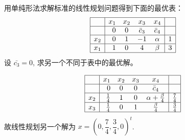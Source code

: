 \begin{Problem}
    用单纯形法求解标准的线性规划问题得到下面的最优表：
    \[\begin{array}{|l|rccc|c|}
        \hline & x_{1} & x_{2} & x_{3} & x_{4} & \\
        \hline & 0 & 0 & \bar{c}_{3} & \bar{c}_{4} & \\
        \hline x_{2} & 0 & 1 & -1 & \alpha & 1 \\
        \hline x_{1} & 1 & 0 & 4 & \beta & 3 \\
        \hline
    \end{array}\]
    设 $\bar{c_3} = 0$, 求另一个不同于表中的最优解。

    \Answer 
    \[\begin{array}{|l|rccc|c|}
        \hline & x_{1} & x_{2} & x_{3} & x_{4} & \\
        \hline & 0 & 0 & 0 & \bar{c}_{4} & \\
        \hline x_{2} & \frac{1}{4} & 1 & 0 & \alpha + \frac{\beta}{4} & \frac{7}{4} \\
        \hline x_{3} & \frac{1}{4} & 0 & 1 & \frac{\beta}{4} & \frac{3}{4} \\
        \hline
    \end{array}\]
    故线性规划另一个解为 $x = \left(0, \dfrac{7}{4}, \dfrac{3}{4}, 0\right)^t$.
\end{Problem}

